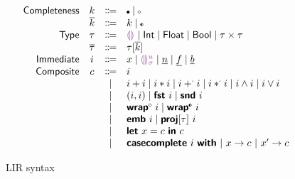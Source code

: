 \documentclass[index.tex]{subfiles}
\begin{document}
\begin{figure}
  \[\begin{array}{rccl}
    \SortNComplete & \SortNCompleteVar & \Coloneqq & \CNC \mid \CNI \\
    \SortComplete  & \SortCompleteVar  & \Coloneqq & \SortNCompleteVar \mid \CII \\
    \SortTypCon    & \SortTypConVar    & \Coloneqq & \TCHole \mid \TCInt \mid \TCFloat \mid \TCBool 
                                                   \mid \TCPair{\SortTypConVar}{\SortTypConVar} \\
    \SortTyp       & \SortTypVar       & \Coloneqq & \TMk{\SortTypConVar}{\SortCompleteVar} \\
    \SortImm       & \SortImmVar       & \Coloneqq & x \mid \EEHole{\SortHoleIdVar}{\SortHoleEnvVar}
                                                   \mid \EIntLit \mid \EFloatLit \mid \EBoolLit \\
    \SortComp      & \SortCompVar      & \Coloneqq & \SortImmVar \\
                   &                   & \mid         & \EPlus{\SortImmVar}{\SortImmVar} 
                                                   \mid \ETimes{\SortImmVar}{\SortImmVar}
                                                   \mid \EFPlus{\SortImmVar}{\SortImmVar} 
                                                   \mid \EFTimes{\SortImmVar}{\SortImmVar}
                                                   \mid \EAnd{\SortImmVar}{\SortImmVar}
                                                   \mid \EOr{\SortImmVar}{\SortImmVar} \\
                   &                   & \mid         & \EPair{\SortImmVar}{\SortImmVar}
                                                   \mid \EProjL{\SortImmVar}
                                                   \mid \EProjR{\SortImmVar} \\
                   &                   & \mid         & \EWrapIntoNI{\SortImmVar}
                                                   \mid \EWrapIntoII{\SortImmVar} \\
                   &                   & \mid         & \EEmbed{\SortImmVar}
                                                   \mid \EProj{\SortImmVar}{\SortTypConVar} \\
                   &                   & \mid         & \ELet{x}{\SortCompVar} \EInn{\SortCompVar} \\
                   &                   & \mid         & \ECaseCompleteWith{\SortImmVar}
                                                    ~\ECaseCompleteBranch{x}{\SortCompVar}
                                                    ~\ECaseCompleteBranch{x'}{\SortCompVar}
  \end{array}\]
  \caption{LIR syntax}
  \label{fig:lir-syntax}
\end{figure}
\end{document}
